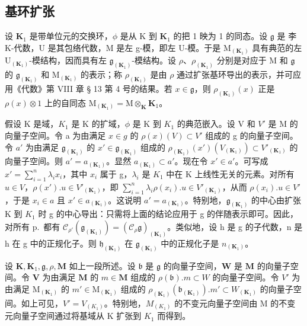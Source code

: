 \subsection{基环扩张}

设 \(\mathbf{K}_1\) 是带单位元的交换环，\(\phi\) 是从 K 到 \(\mathbf{K}_1\) 的把 1 映为 1 的同态。设 \(\mathfrak{g}\) 是 李 K-代数，U 是其包络代数，M 是左 g-模，即左 U-模。于是 \(\mathrm{M}_{(\mathbf{K}_1)}\) 具有典范的左 \(\mathrm{U}_{(\mathbf{K}_1)}\)-模结构，因而具有左 \(\mathfrak{g}_{(\mathbf{K}_1)}\)-模结构。设 \(\rho\)、\(\rho_{(\mathbf{K}_1)}\) 分别是对应于 M 和 \(\mathfrak{g}\) 的 \(\mathfrak{g}_{(\mathbf{K}_1)}\) 和 \(\mathrm{M}_{(\mathbf{K}_1)}\) 的表示；称 \(\rho_{(\mathbf{K}_1)}\) 是由 \(\rho\) 通过扩张基环导出的表示，并可应用《代数》第 VIII 章 § 13 第 4 号的结果。若 \(x \in \mathfrak{g}\)，则 \(\rho_{(\mathbf{K}_1)}(x)\) 正是 \(\rho(x) \otimes 1\) 上的自同态 \(\mathrm{M}_{(\mathbf{K}_1)} = \mathrm{M} \otimes_{\mathbf{K}} \mathbf{K}_1\)。

假设 K 是域，\(K_{1}\) 是 K 的扩域，\(\phi\) 是 K 到 \(K_{1}\) 的典范嵌入。设 V 和 \(V'\) 是 M 的向量子空间。令 a 为由满足 \(x \in g\) 的 \(\rho(x)(V) \subset V'\) 组成的 g 的向量子空间。令 \(a'\) 为由满足 \(\mathfrak{g}_{(\mathbf{K}_{1})}\) 的 \(x' \in \mathfrak{g}_{(\mathbf{K}_{1})}\) 组成的 \(\rho_{(\mathbf{K}_{1})}(x')(V_{(\mathbf{K}_{1})}) \subset V'_{(\mathbf{K}_{1})}\) 的向量子空间。则 \(a' = a_{(\mathbf{K}_{1})}\)。显然 \(a_{(\mathbf{K}_{1})} \subset a'\)。现在令 \(x' \in a'\)。可写成 \(x' = \sum_{i=1}^{n} \lambda_{i} x_{i}\)，其中 \(x_{i}\) 属于 g，\(\lambda_{i}\) 是 \(K_{1}\) 中在 K 上线性无关的元素。对所有 \(u \in V\)，\(\rho(x') .u \in V'_{(\mathbf{K}_{1})}\)，即 \(\sum_{i=1}^{n} \lambda_{i} \rho(x_{i}) .u \in V'_{(\mathbf{K}_{1})}\)，从而 \(\rho(x_{i}) .u \in V'\)，于是 \(x_{i} \in a\) 且 \(x' \in a_{(\mathbf{K}_{1})}\)。这说明 \(a' = a_{(\mathbf{K}_{1})}\)。特别地，\(\mathfrak{g}_{(\mathbf{K}_{1})}\) 的中心由扩张 K 到 \(K_{1}\) 时 g 的中心导出：只需将上面的结论应用于 g 的伴随表示即可。因此，对所有 p.~都有 \(\mathcal{C}_{\rho'}(\mathfrak{g}_{(\mathbf{K}_{1})}) = (\mathcal{C}_{\rho}\mathfrak{g})_{(\mathbf{K}_{1})}\)。类似地，设 h 是 g 的子代数，n 是 h 在 g 中的正规化子。则 \(\mathfrak{h}_{(\mathbf{K}_{1})}\) 在 \(\mathfrak{g}_{(\mathbf{K}_{1})}\) 中的正规化子是 \(n_{(\mathbf{K}_{1})}\)。

设 \(\mathbf{K}, \mathbf{K}_{1}, \mathfrak{g}, \rho, \mathbf{M}\) 如上一段所述。设 \(\mathfrak{b}\) 是 \(\mathfrak{g}\) 的向量子空间，\(\mathbf{W}\) 是 \(\mathbf{M}\) 的向量子空间。令 \(\mathbf{V}\) 为由满足 \(\mathbf{M}\) 的 \(m \in \mathbf{M}\) 组成的 \(\rho(\mathfrak{b}). m \subset W\) 的向量子空间。令 \(V'\) 为由满足 \(\mathrm{M}_{(\mathbf{K}_{1})}\) 的 \(m' \in \mathrm{M}_{(\mathbf{K}_{1})}\) 组成的 \(\rho_{(\mathbf{K}_{1})}(\mathfrak{b}_{(\mathbf{K}_{1})}). m' \subset W_{(\mathbf{K}_{1})}\) 的向量子空间。如上可见，\(V' = V_{(K_1)}\)。特别地，\(M_{(K_1)}\) 的不变元向量子空间由 M 的不变元向量子空间通过将基域从 K 扩张到 \(K_1\) 而得到。


